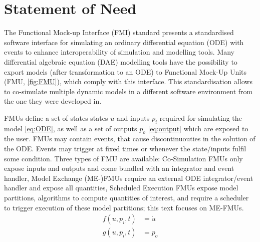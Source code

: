 \documentclass{juliacon}
\begin{document}


\maketitle

\begin{abstract}
The Functional Mock-up Interface (FMI) standard \cite{modelicaassociation} facilitates interoperability of differential algebraic equation (DAE) simulation software.
Compliant models (so-called Functional Mock-up Units (FMUs)) can be simulated through a standardized interface, which allows to easily exchange these models between different software tools.
The Julia ecosystem contains an extensive FMI package suite that supports (among others) simulation, import, export and differentiation of FMUs.
This paper presents FMIExchange.jl \cite{bex2025e}, which provides utilities to simplify interfacing FMUs with the popular DifferentialEquations.jl package \cite{rackauckas2017}.
Additionally, FMIExchange.jl provides tools to compose simulations combining multiple FMUs and native Julia models.
\end{abstract}

\section{Statement of Need}
The Functional Mock-up Interface (FMI) standard \cite{modelicaassociation} presents a standardised software interface for simulating an ordinary differential equation (ODE) with events to enhance interoperability of simulation and modelling tools.
Many differential algebraic equation (DAE) modelling tools have the possibility to export models (after transformation to an ODE) to Functional Mock-Up Units (FMU, \cref{fig:FMU}), which comply with this interface.
This standardisation allows to  co-simulate multiple dynamic models in a different software environment from the one they were developed in.

FMUs define a set of states states $u$ and inputs $p_i$ required for simulating the model \cref{eq:ODE}, as well as a set of outputs $p_o$ \cref{eq:output} which are exposed to the user.
FMUs may contain events, that cause discontinuouties in the solution of the ODE.
Events may trigger at fixed times or whenever the state/inputs fulfil some condition.
Three types of FMU are available: Co-Simulation FMUs only expose inputs and outputs and come bundled with an integrator and event handler, Model Exchange (ME-)FMUs require an external ODE integrator/event handler and expose all quantities, Scheduled Execution FMUs expose model partitions, algorithms to compute quantities of interest, and require a scheduler to trigger execution of these model partitions; this text focuses on ME-FMUs.
\begin{align}
f(u, p_{i}, t) &= \dot{u} \label{eq:ODE}\\
g(u, p_{i}, t) &= p_o \label{eq:output}
\end{align}
\end{document}
